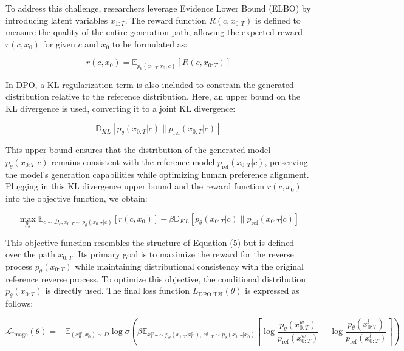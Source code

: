 To address this challenge, researchers leverage Evidence Lower Bound (ELBO) by introducing latent variables \( x_{1:T} \). The reward function \( R(c, x_{0:T}) \) is defined to measure the quality of the entire generation path, allowing the expected reward \( r(c, x_0) \) for given \( c \) and \( x_0 \) to be formulated as:

\begin{equation}
r(c, x_0) = \mathbb{E}_{p_\theta(x_{1:T} | x_0, c)} [R(c, x_{0:T})]
\end{equation}

In DPO, a KL regularization term is also included to constrain the generated distribution relative to the reference distribution. Here, an upper bound on the KL divergence is used, converting it to a joint KL divergence:

\begin{equation}
\mathbb{D}_{KL}[p_\theta(x_{0:T} | c) \parallel p_{\text{ref}}(x_{0:T} | c)]
\end{equation}

This upper bound ensures that the distribution of the generated model \( p_\theta(x_{0:T} | c) \) remains consistent with the reference model \( p_{\text{ref}}(x_{0:T} | c) \), preserving the model’s generation capabilities while optimizing human preference alignment. Plugging in this KL divergence upper bound and the reward function \( r(c, x_0) \) into the objective function, we obtain:

\begin{equation}
\max_{p_\theta} \mathbb{E}_{c \sim \mathcal{D}_c, x_{0:T} \sim p_\theta(x_{0:T} | c)} [r(c, x_0)] - \beta \mathbb{D}_{KL} [p_\theta(x_{0:T} | c) \parallel p_{\text{ref}}(x_{0:T} | c)]
\end{equation}

This objective function resembles the structure of Equation (5) but is defined over the path \( x_{0:T} \). Its primary goal is to maximize the reward for the reverse process \( p_\theta(x_{0:T}) \) while maintaining distributional consistency with the original reference reverse process. To optimize this objective, the conditional distribution \( p_\theta(x_{0:T}) \) is directly used. The final loss function \( L_{\text{DPO-T2I}}(\theta) \) is expressed as follows:

\begin{equation}
\mathcal{L}_{\text{Image}}(\theta) = -\mathbb{E}_{(x_0^w, x_0^l) \sim D} \log \sigma \left( \beta \mathbb{E}_{x_{1:T}^w \sim p_\theta(x_{1:T} | x_0^w), \, x_{1:T}^l \sim p_\theta(x_{1:T} | x_0^l)} \left[ \log \frac{p_\theta(x_{0:T}^w)}{p_{\text{ref}}(x_{0:T}^w)} - \log \frac{p_\theta(x_{0:T}^l)}{p_{\text{ref}}(x_{0:T}^l)} \right] \right)
\end{equation}

